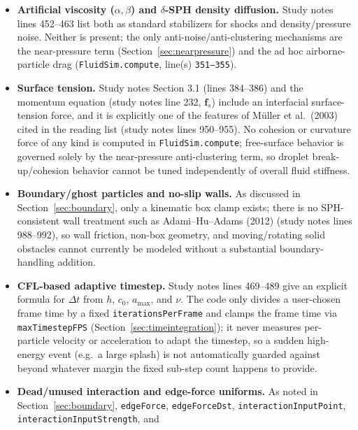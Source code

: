 \documentclass[11pt]{article}
\newcommand{\file}[1]{\texttt{#1}}
\newcommand{\loc}[2]{\texttt{#1}, line(s) \texttt{#2}}
\begin{document}
\begin{itemize}
    measurable kinematic viscosity $\nu$ and cannot be validated against a
    Reynolds-number-based benchmark (study notes lines 374--378).
    \item \textbf{Artificial viscosity ($\alpha,\beta$) and $\delta$-SPH
    density diffusion.} Study notes lines 452--463 list both as standard
    stabilizers for shocks and density/pressure noise. Neither is present;
    the only anti-noise/anti-clustering mechanisms are the near-pressure
    term (Section~\ref{sec:nearpressure}) and the ad hoc airborne-particle
    drag (\loc{FluidSim.compute}{351--355}).
    \item \textbf{Surface tension.} Study notes Section 3.1 (lines
    384--386) and the momentum equation (study notes line 232,
    $\mathbf{f}_s$) include an interfacial surface-tension force, and it is
    explicitly one of the features of M\"uller et al.\ (2003) cited in the
    reading list (study notes lines 950--955). No cohesion or curvature
    force of any kind is computed in \file{FluidSim.compute}; free-surface
    behavior is governed solely by the near-pressure anti-clustering term,
    so droplet break-up/cohesion behavior cannot be tuned independently of
    overall fluid stiffness.
    \item \textbf{Boundary/ghost particles and no-slip walls.} As discussed
    in Section~\ref{sec:boundary}, only a kinematic box clamp exists; there
    is no SPH-consistent wall treatment such as Adami--Hu--Adams (2012)
    (study notes lines 988--992), so wall friction, non-box geometry, and
    moving/rotating solid obstacles cannot currently be modeled without a
    substantial boundary-handling addition.
    \item \textbf{CFL-based adaptive timestep.} Study notes lines 469--489
    give an explicit formula for $\Delta t$ from $h$, $c_0$, $a_{\max}$, and
    $\nu$. The code only divides a user-chosen frame time by a fixed
    \texttt{iterationsPerFrame} and clamps the frame time via
    \texttt{maxTimestepFPS} (Section~\ref{sec:timeintegration}); it never
    measures per-particle velocity or acceleration to adapt the timestep,
    so a sudden high-energy event (e.g.\ a large splash) is not automatically
    guarded against beyond whatever margin the fixed sub-step count happens
    to provide.
    \item \textbf{Dead/unused interaction and edge-force uniforms.} As noted
    in Section~\ref{sec:boundary}, \texttt{edgeForce}, \texttt{edgeForceDst},
    \texttt{interactionInputPoint}, \texttt{interactionInputStrength}, and

\end{itemize}
\end{document}
